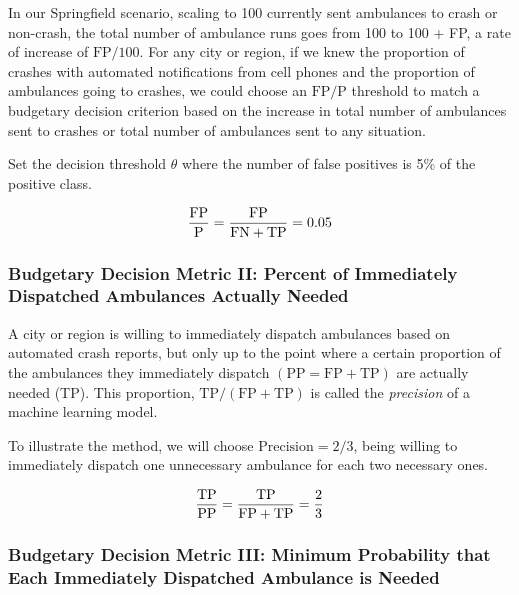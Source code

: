  In our Springfield scenario, scaling to 100 currently sent ambulances to crash or non-crash, the total number of ambulance runs goes from 100 to 100 + FP, a rate of increase of $\text{FP}/100$.  For any city or region, if we knew the proportion of crashes with automated notifications from cell phones and the proportion of ambulances going to crashes, we could choose an
 $\text{FP}/\text{P}$
 threshold to match a budgetary decision criterion based on the increase in total number of ambulances sent to crashes or total number of ambulances sent to any situation.

Set the decision threshold $\theta$ where the number of false positives is 5\% of the positive class.  

\begin{equation} \label{eq:budget_1}\hfil
\frac{ \text{FP}}{\text{P}}
=
\frac{ \text{FP}}{\text{FN} + \text{TP}}
= 0.05
\end{equation}

\subsubsection{Budgetary Decision Metric II:  Percent of Immediately Dispatched Ambulances Actually Needed}
\label{political_decisions_precision}

A city or region is willing to immediately dispatch ambulances based on automated crash reports, but only up to the point where a certain proportion of the ambulances they immediately dispatch 
$(\text{PP} = \text{FP} + \text{TP})$ 
are actually needed (TP).  This proportion, 
$\text{TP}/(\text{FP} + \text{TP})$ 
is called the {\it precision} of a machine learning model.

To illustrate the method, we will choose $\text{Precision} = 2/3$, being willing to immediately dispatch one unnecessary ambulance for each two necessary ones.

\begin{equation} \label{eq:budget_2}\hfil
\frac{ \text{TP}}{\text{PP}}
=
\frac{ \text{TP}}{\text{FP} + \text{TP}}
= \frac{2}{3}
\end{equation}

\subsubsection{Budgetary Decision Metric III:  Minimum Probability that Each Immediately Dispatched Ambulance is Needed}
\label{political_decisions_probability}

